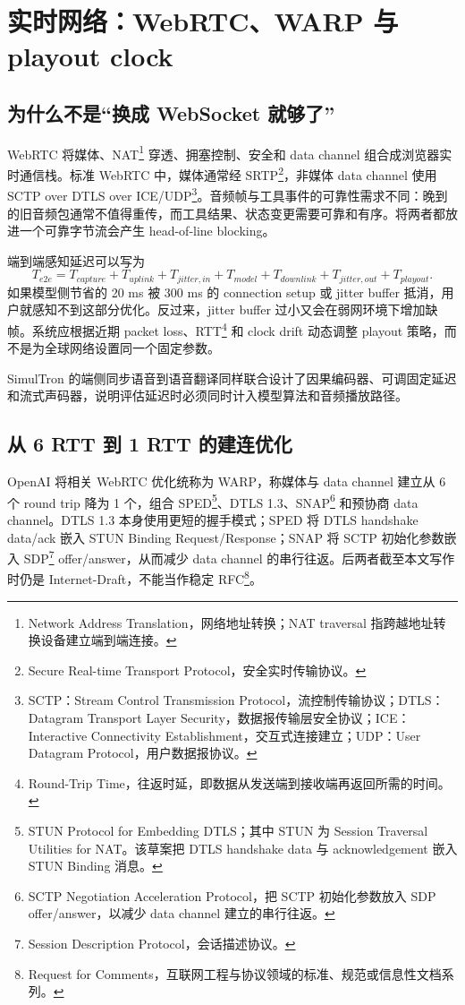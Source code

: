 \section{实时网络：WebRTC、WARP 与 playout clock}

\subsection{为什么不是“换成 WebSocket 就够了”}

WebRTC 将媒体、NAT\footnote{Network Address Translation，网络地址转换；NAT traversal 指跨越地址转换设备建立端到端连接。} 穿透、拥塞控制、安全和 data channel 组合成浏览器实时通信栈。标准 WebRTC 中，媒体通常经 SRTP\footnote{Secure Real-time Transport Protocol，安全实时传输协议。}，非媒体 data channel 使用 SCTP over DTLS over ICE/UDP\footnote{SCTP：Stream Control Transmission Protocol，流控制传输协议；DTLS：Datagram Transport Layer Security，数据报传输层安全协议；ICE：Interactive Connectivity Establishment，交互式连接建立；UDP：User Datagram Protocol，用户数据报协议。}\cite{alvestrand2021webrtc,jesup2021datachannels}。音频帧与工具事件的可靠性需求不同：晚到的旧音频包通常不值得重传，而工具结果、状态变更需要可靠和有序。将两者都放进一个可靠字节流会产生 head-of-line blocking。

端到端感知延迟可以写为
\begin{equation}
T_{e2e}=T_{capture}+T_{uplink}+T_{jitter,in}+T_{model}+T_{downlink}+T_{jitter,out}+T_{playout}.
\end{equation}
如果模型侧节省的 20 ms 被 300 ms 的 connection setup 或 jitter buffer 抵消，用户就感知不到这部分优化。反过来，jitter buffer 过小又会在弱网环境下增加缺帧。系统应根据近期 packet loss、RTT\footnote{Round-Trip Time，往返时延，即数据从发送端到接收端再返回所需的时间。} 和 clock drift 动态调整 playout 策略，而不是为全球网络设置同一个固定参数。

SimulTron 的端侧同步语音到语音翻译同样联合设计了因果编码器、可调固定延迟和流式声码器\cite{agranovich2024simultron}，说明评估延迟时必须同时计入模型算法和音频播放路径。

\subsection{从 6 RTT 到 1 RTT 的建连优化}

\FOne OpenAI 将相关 WebRTC 优化统称为 WARP，称媒体与 data channel 建立从 6 个 round trip 降为 1 个，组合 SPED\footnote{STUN Protocol for Embedding DTLS；其中 STUN 为 Session Traversal Utilities for NAT。该草案把 DTLS handshake data 与 acknowledgement 嵌入 STUN Binding 消息。}、DTLS 1.3、SNAP\footnote{SCTP Negotiation Acceleration Protocol，把 SCTP 初始化参数放入 SDP offer/answer，以减少 data channel 建立的串行往返。} 和预协商 data channel\cite{openai2026continuous}。DTLS 1.3 本身使用更短的握手模式\cite{rescorla2022dtls13}；SPED 将 DTLS handshake data/ack 嵌入 STUN Binding Request/Response；SNAP 将 SCTP 初始化参数嵌入 SDP\footnote{Session Description Protocol，会话描述协议。} offer/answer，从而减少 data channel 的串行往返\cite{hancke2026sped,hancke2026snap}。后两者截至本文写作时仍是 Internet-Draft，不能当作稳定 RFC\footnote{Request for Comments，互联网工程与协议领域的标准、规范或信息性文档系列。}。

